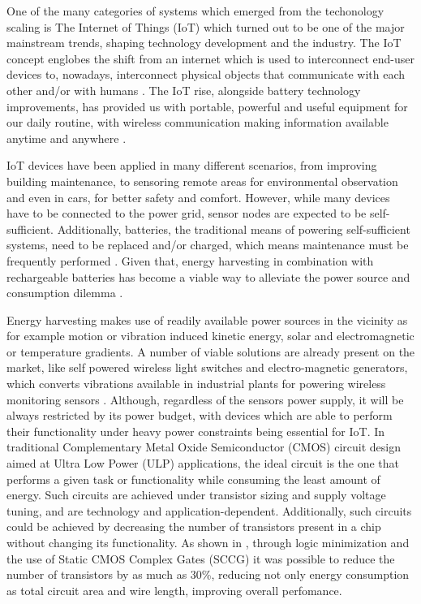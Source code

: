 \documentclass[diss,pgmicro,english]{iiufrgs}
\begin{document}
    One of the many categories of systems which emerged from the techonology scaling is The Internet of Things (IoT) which turned out to be one of the major mainstream trends, shaping technology development and the industry. The IoT concept englobes the shift from an internet which is used to interconnect end-user devices to, nowadays, interconnect physical objects that communicate with each other and/or with humans \cite{miorandi2012internet}. The IoT rise, alongside battery technology improvements, has provided us with portable, powerful and useful equipment for our daily routine, with wireless communication making information available anytime and anywhere \cite{manoli2010energy}.

    IoT devices have been applied in many different scenarios, from improving building maintenance, to sensoring remote areas for environmental observation and even in cars, for better safety and comfort. However, while many devices have to be connected to the power grid, sensor nodes are expected to be self-sufficient. Additionally, batteries, the traditional means of powering self-sufficient systems, need to be replaced and/or charged, which means maintenance must be frequently performed \cite{bleitner2018comparison}. Given that, energy harvesting in combination with rechargeable batteries has become a viable way to alleviate the power source and consumption dilemma \cite{manoli2010energy}.

    Energy harvesting makes use of readily available power sources in the vicinity as for example motion or vibration induced kinetic energy, solar and electromagnetic or temperature gradients. A number of viable solutions are already present on the market, like self powered wireless light switches and electro-magnetic generators, which converts vibrations available in industrial plants for powering wireless monitoring sensors \cite{manoli2010energy} \cite{bleitner2018comparison}. Although, regardless of the sensors power supply, it will be always restricted by its power budget, with devices which are able to perform their functionality under heavy power constraints being essential for IoT. In traditional Complementary Metal Oxide Semiconductor (CMOS) circuit design aimed at Ultra Low Power (ULP) applications, the ideal circuit is the one that performs a given task or functionality while consuming the least amount of energy. Such circuits are achieved under transistor sizing and supply voltage tuning, and are technology and application-dependent. Additionally, such circuits could be achieved by decreasing the number of transistors present in a chip without changing its functionality. As shown in \cite{reis1995associating}, through logic minimization and the use of Static CMOS Complex Gates (SCCG) it was possible to reduce the number of transistors by as much as 30\%, reducing not only energy consumption as total circuit area and wire length, improving overall perfomance.
\end{document}
